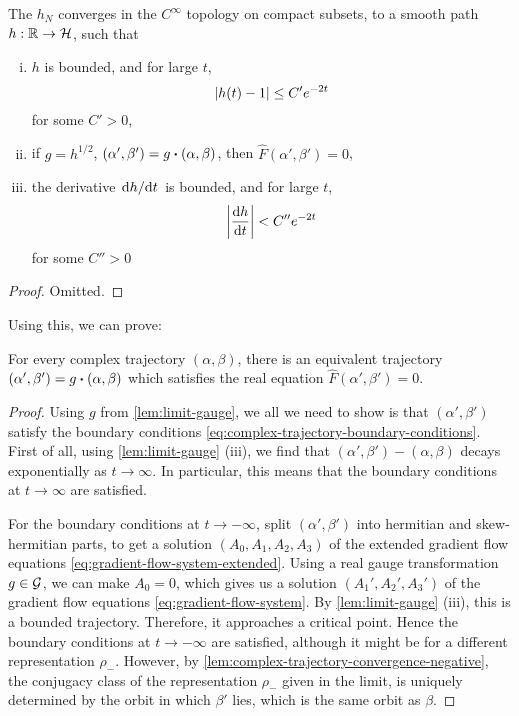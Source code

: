 \documentclass{report}
\begin{document}
\begin{lemma}
    \label{lem:limit-gauge}
    The \(h_N\) converges in the \(C^\infty\) topology on compact subsets, to a smooth path \(h : \mathbb{R} \to \mathcal{H}\), such that

    \begin{enumerate}[(i)]
        \item \(h\) is bounded, and for large \(t\), \[\abs{h(t) - 1} \le C'e^{-2t}\] for some \(C' > 0\),
        \item if \(g = h^{1/2}\), \((\alpha', \beta') = g \vdot (\alpha, \beta)\), then \(\hat F(\alpha', \beta') = 0\),
        \item the derivative \(\dv*{h}{t}\) is bounded, and for large \(t\), \[\abs{\dv{h}{t}} < C''e^{-2t}\] for some \(C'' > 0\)
    \end{enumerate}
\end{lemma}

\begin{proof}
    Omitted.
\end{proof}

Using this, we can prove:

\begin{proposition}
    \label{prop:real-trajectory-existence}

    For every complex trajectory \((\alpha, \beta)\), there is an equivalent trajectory \((\alpha', \beta') = g \vdot (\alpha, \beta)\) which satisfies the real equation \(\hat F(\alpha', \beta') = 0\).
\end{proposition}

\begin{proof}
    Using \(g\) from \cref{lem:limit-gauge}, we all we need to show is that \((\alpha', \beta')\) satisfy the boundary conditions \cref{eq:complex-trajectory-boundary-conditions}. First of all, using \cref{lem:limit-gauge} (iii), we find that \((\alpha', \beta') - (\alpha, \beta)\) decays exponentially as \(t \to \infty\). In particular, this means that the boundary conditions at \(t \to \infty\) are satisfied.

    For the boundary conditions at \(t \to -\infty\), split \((\alpha', \beta')\) into hermitian and skew-hermitian parts, to get a solution \((A_0, A_1, A_2, A_3)\) of the extended gradient flow equations \cref{eq:gradient-flow-system-extended}. Using a real gauge transformation \(g \in \mathcal{G}\), we can make \(A_0 = 0\), which gives us a solution \((A_1', A_2', A_3')\) of the gradient flow equations \cref{eq:gradient-flow-system}. By \cref{lem:limit-gauge} (iii), this is a bounded trajectory. Therefore, it approaches a critical point. Hence the boundary conditions at \(t \to -\infty\) are satisfied, although it might be for a different representation \(\rho_-\). However, by \cref{lem:complex-trajectory-convergence-negative}, the conjugacy class of the representation \(\rho_-\) given in the limit, is uniquely determined by the orbit in which \(\beta'\) lies, which is the same orbit as \(\beta\).
\end{proof}
\end{document}
